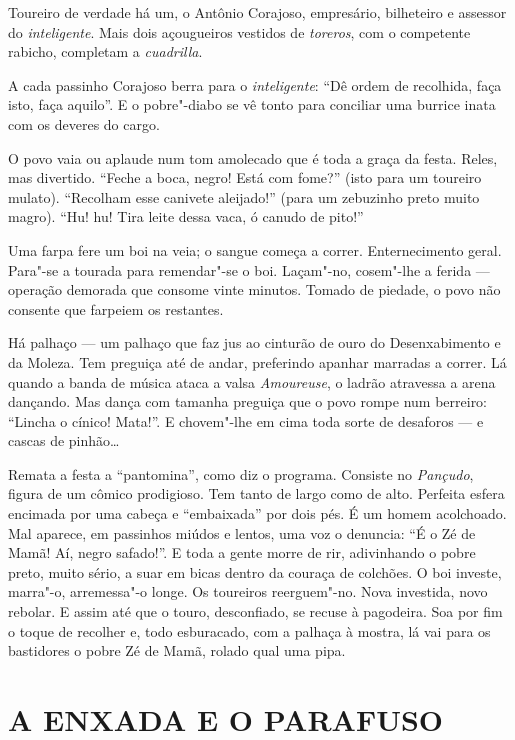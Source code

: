 Toureiro de verdade há um, o Antônio Corajoso, empresário, bilheteiro e
assessor do \emph{inteligente}. Mais dois açougueiros vestidos de
\emph{toreros}, com o competente rabicho, completam a \emph{cuadrilla}.

A cada passinho Corajoso berra para o \emph{inteligente}: ``Dê ordem de
recolhida, faça isto, faça aquilo''. E o pobre"-diabo se vê tonto para
conciliar uma burrice inata com os deveres do cargo.

O povo vaia ou aplaude num tom amolecado que é toda a graça da festa.
Reles, mas divertido. ``Feche a boca, negro! Está com fome?'' (isto para
um toureiro mulato). ``Recolham esse canivete aleijado!'' (para um
zebuzinho preto muito magro). ``Hu! hu! Tira leite dessa vaca, ó canudo
de pito!''

Uma farpa fere um boi na veia; o sangue começa a correr. Enternecimento
geral. Para"-se a tourada para remendar"-se o boi. Laçam"-no, cosem"-lhe a
ferida --- operação demorada que consome vinte minutos. Tomado de
piedade, o povo não consente que farpeiem os restantes.

Há palhaço --- um palhaço que faz jus ao cinturão de ouro do
Desenxabimento e da Moleza. Tem preguiça até de andar, preferindo
apanhar marradas a correr. Lá quando a banda de música ataca a valsa
\emph{Amoureuse}, o ladrão atravessa a arena dançando. Mas dança com
tamanha preguiça que o povo rompe num berreiro: ``Lincha o cínico!
Mata!''. E chovem"-lhe em cima toda sorte de desaforos --- e cascas de
pinhão\ldots{}

Remata a festa a ``pantomina'', como diz o programa. Consiste no
\emph{Pançudo}, figura de um cômico prodigioso. Tem tanto de largo como
de alto. Perfeita esfera encimada por uma cabeça e ``embaixada'' por
dois pés. É um homem acolchoado. Mal aparece, em passinhos miúdos e
lentos, uma voz o denuncia: ``É o Zé de Mamã! Aí, negro safado!''. E
toda a gente morre de rir, adivinhando o pobre preto, muito sério, a
suar em bicas dentro da couraça de colchões. O boi investe, marra"-o,
arremessa"-o longe. Os toureiros reerguem"-no. Nova investida, novo
rebolar. E assim até que o touro, desconfiado, se recuse à pagodeira.
Soa por fim o toque de recolher e, todo esburacado, com a palhaça à
mostra, lá vai para os bastidores o pobre Zé de Mamã, rolado qual uma
pipa.

\section*{A ENXADA E O PARAFUSO}

